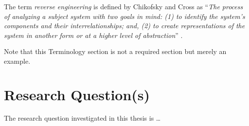 The term \emph{reverse engineering} is defined by Chikofsky and Cross as 
``\emph{The process of analyzing a subject system with two goals in mind: 
(1) to identify the system's components and their interrelationships; and,
(2) to create representations of the system in another form or at a higher 
level of abstraction}'' \cite{c11tester}.

Note that this Terminology section is not a required section but 
merely an example.

\section{Research Question(s)}

The research question investigated in this thesis is \ldots


